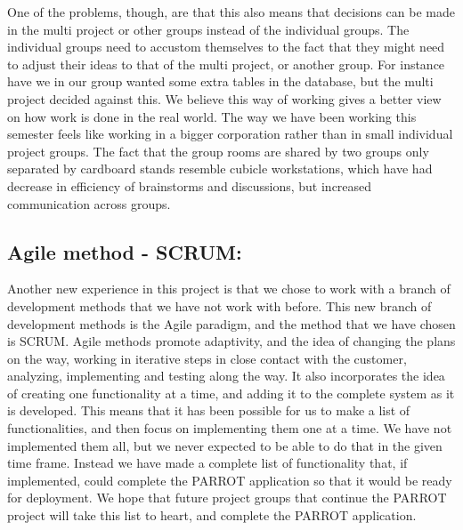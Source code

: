 One of the problems, though, are that this also means that decisions can be made in the multi project or other groups instead of the individual groups.\newline
The individual groups need to accustom themselves to the fact that they might need to adjust their ideas to that of the multi project, or another group. 
For instance have we in our group wanted some extra tables in the database, but the multi project decided against this.\newline
We believe this way of working gives a better view on how work is done in the real world. 
The way we have been working this semester feels like working in a bigger corporation rather than in small individual project groups.  
The fact that the group rooms are shared by two groups only separated by cardboard stands resemble cubicle workstations, which have had decrease in efficiency of brainstorms and discussions, but increased communication across groups.\newline
\\

\subsection*{Agile method - SCRUM:}
Another new experience in this project is that we chose to work with a branch of development methods that we have not work with before. 
This new branch of development methods is the Agile paradigm, and the method that we have chosen is SCRUM. 
Agile methods promote adaptivity, and the idea of changing the plans on the way, working in iterative steps in close contact with the customer, analyzing, implementing and testing along the way. 
It also incorporates the idea of creating one functionality at a time, and adding it to the complete system as it is developed. 
This means that it has been possible for us to make a list of functionalities, and then focus on implementing them one at a time.\newline
We have not implemented them all, but we never expected to be able to do that in the given time frame.
Instead we have made a complete list of functionality that, if implemented, could complete the PARROT application so that it would be ready for deployment.
We hope that future project groups that continue the PARROT project will take this list to heart, and complete the PARROT application.\newline

